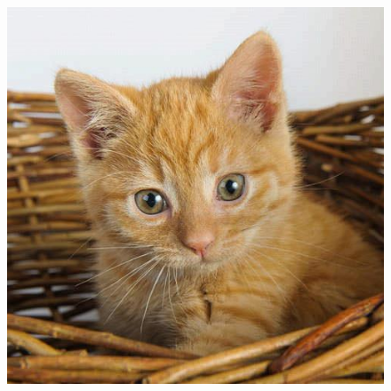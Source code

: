\begin{figure}
\begin{minipage}{.45\linewidth}
		\label{img2}
	\end{minipage}
		\centering
		\includegraphics[width=.97\textwidth]{sections/pictures/encrypted.jpg}
		\label{img3}
\end{figure} 